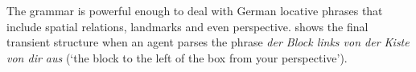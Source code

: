 The grammar is powerful enough to deal with German locative
phrases that include spatial relations, landmarks and even perspective.
 shows the final transient structure when an agent
parses the phrase \textit{der Block links von der Kiste von dir aus} (`the block
to the left of the box from your perspective').

%
% 
%